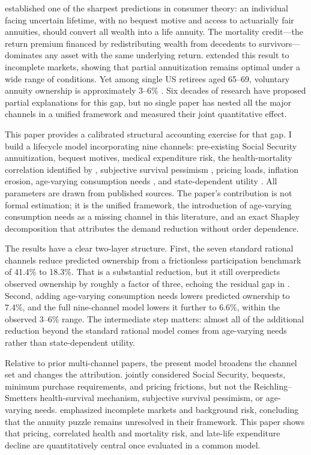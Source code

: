 \documentclass[12pt]{article}
\begin{document}
\citet{yaari1965} established one of the sharpest predictions in consumer theory: an individual facing uncertain lifetime, with no bequest motive and access to actuarially fair annuities, should convert all wealth into a life annuity. The mortality credit---the return premium financed by redistributing wealth from decedents to survivors---dominates any asset with the same underlying return. \citet{davidoff2005} extended this result to incomplete markets, showing that partial annuitization remains optimal under a wide range of conditions. Yet among single US retirees aged 65--69, voluntary annuity ownership is approximately 3--6\% \citep{lockwood2012, dushiwebb2004, poterbaventiwise2011}. Six decades of research have proposed partial explanations for this gap, but no single paper has nested all the major channels in a unified framework and measured their joint quantitative effect.

This paper provides a calibrated structural accounting exercise for that gap. I build a lifecycle model incorporating nine channels: pre-existing Social Security annuitization, bequest motives, medical expenditure risk, the health-mortality correlation identified by \citet{reichlingsmetters2015}, subjective survival pessimism \citep{odeasturrock2023}, pricing loads, inflation erosion, age-varying consumption needs \citep{aguiarhurst2013}, and state-dependent utility \citep{finkelsteinluttmer2013}. All parameters are drawn from published sources. The paper's contribution is not formal estimation; it is the unified framework, the introduction of age-varying consumption needs as a missing channel in this literature, and an exact Shapley decomposition that attributes the demand reduction without order dependence.

The results have a clear two-layer structure. First, the seven standard rational channels reduce predicted ownership from a frictionless participation benchmark of 41.4\% to 18.3\%. That is a substantial reduction, but it still overpredicts observed ownership by roughly a factor of three, echoing the residual gap in \citet{pashchenko2013}. Second, adding age-varying consumption needs lowers predicted ownership to 7.4\%, and the full nine-channel model lowers it further to 6.6\%, within the observed 3--6\% range. The intermediate step matters: almost all of the additional reduction beyond the standard rational model comes from age-varying needs rather than state-dependent utility.

Relative to prior multi-channel papers, the present model broadens the channel set and changes the attribution. \citet{pashchenko2013} jointly considered Social Security, bequests, minimum purchase requirements, and pricing frictions, but not the Reichling--Smetters health-survival mechanism, subjective survival pessimism, or age-varying needs. \citet{peijnenburg2016} emphasized incomplete markets and background risk, concluding that the annuity puzzle remains unresolved in their framework. This paper shows that pricing, correlated health and mortality risk, and late-life expenditure decline are quantitatively central once evaluated in a common model.
\end{document}
